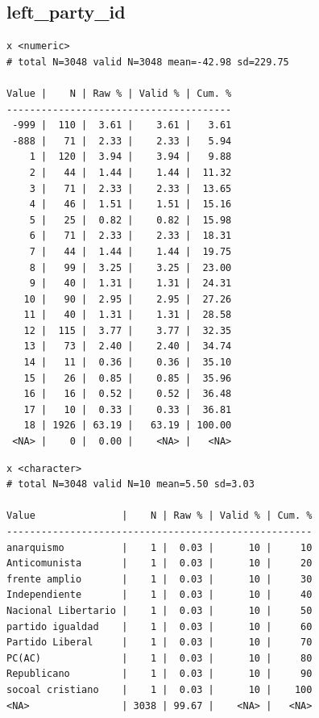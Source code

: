 \documentclass[
  letterpaper,
  DIV=11,
  numbers=noendperiod]{scrreprt}
\newenvironment{Shaded}{\begin{snugshade}}{\end{snugshade}}
\newcommand{\FunctionTok}[1]{\textcolor[rgb]{0.28,0.35,0.67}{#1}}
\newcommand{\NormalTok}[1]{\textcolor[rgb]{0.00,0.23,0.31}{#1}}
\newcommand{\SpecialCharTok}[1]{\textcolor[rgb]{0.37,0.37,0.37}{#1}}
\begin{document}
\hypertarget{left_party_id}{%
\subsection{left\_party\_id}\label{left_party_id}}

\begin{Shaded}
\end{Shaded}

\begin{verbatim}
x <numeric> 
# total N=3048 valid N=3048 mean=-42.98 sd=229.75

Value |    N | Raw % | Valid % | Cum. %
---------------------------------------
 -999 |  110 |  3.61 |    3.61 |   3.61
 -888 |   71 |  2.33 |    2.33 |   5.94
    1 |  120 |  3.94 |    3.94 |   9.88
    2 |   44 |  1.44 |    1.44 |  11.32
    3 |   71 |  2.33 |    2.33 |  13.65
    4 |   46 |  1.51 |    1.51 |  15.16
    5 |   25 |  0.82 |    0.82 |  15.98
    6 |   71 |  2.33 |    2.33 |  18.31
    7 |   44 |  1.44 |    1.44 |  19.75
    8 |   99 |  3.25 |    3.25 |  23.00
    9 |   40 |  1.31 |    1.31 |  24.31
   10 |   90 |  2.95 |    2.95 |  27.26
   11 |   40 |  1.31 |    1.31 |  28.58
   12 |  115 |  3.77 |    3.77 |  32.35
   13 |   73 |  2.40 |    2.40 |  34.74
   14 |   11 |  0.36 |    0.36 |  35.10
   15 |   26 |  0.85 |    0.85 |  35.96
   16 |   16 |  0.52 |    0.52 |  36.48
   17 |   10 |  0.33 |    0.33 |  36.81
   18 | 1926 | 63.19 |   63.19 | 100.00
 <NA> |    0 |  0.00 |    <NA> |   <NA>
\end{verbatim}

\begin{Shaded}
\end{Shaded}

\begin{verbatim}
x <character> 
# total N=3048 valid N=10 mean=5.50 sd=3.03

Value               |    N | Raw % | Valid % | Cum. %
-----------------------------------------------------
anarquismo          |    1 |  0.03 |      10 |     10
Anticomunista       |    1 |  0.03 |      10 |     20
frente amplio       |    1 |  0.03 |      10 |     30
Independiente       |    1 |  0.03 |      10 |     40
Nacional Libertario |    1 |  0.03 |      10 |     50
partido igualdad    |    1 |  0.03 |      10 |     60
Partido Liberal     |    1 |  0.03 |      10 |     70
PC(AC)              |    1 |  0.03 |      10 |     80
Republicano         |    1 |  0.03 |      10 |     90
socoal cristiano    |    1 |  0.03 |      10 |    100
<NA>                | 3038 | 99.67 |    <NA> |   <NA>
\end{verbatim}
\end{document}

